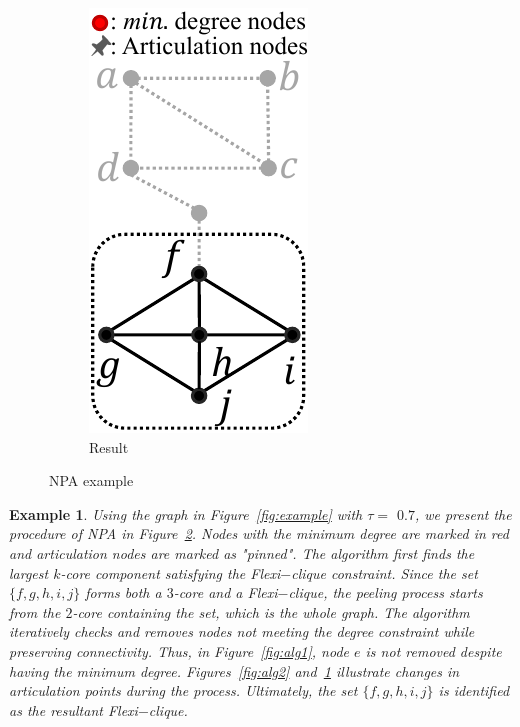 \documentclass[sigconf]{acmart}
\newtheorem{example}{Example}
\newcommand{\flexi}{\textsf{Flexi$-$clique}}
\newcommand{\NPA}{\textsf{NPA}}
\begin{document}
\begin{figure}[h]
\begin{subfigure}{.32\linewidth}
\includegraphics[width=0.7\linewidth]{figures/algorithm_3.pdf}
\vspace{-0.2cm}
\caption{Result}
\label{fig:alg3}
\end{subfigure}
\vspace{-0.3cm}
\caption{{\NPA} example}
\vspace{-0.3cm}
\label{fig:gpa}
\vspace{-0.3cm}
\end{figure}

\begin{example}
Using the graph in Figure~\ref{fig:example} with $\tau =$ $0.7$, we present the procedure of {\NPA} in Figure~\ref{fig:gpa}. Nodes with the minimum degree are marked in red and articulation nodes are marked as "pinned". The algorithm first finds the largest $k$-core component satisfying the {\flexi} constraint. Since the set $\{f, g, h, i, j\}$ forms both a $3$-core and a {\flexi}, the peeling process starts from the $2$-core containing the set, which is the whole graph. The algorithm iteratively checks and removes nodes not meeting the degree constraint while preserving connectivity. Thus, in Figure~\ref{fig:alg1}, node $e$ is not removed despite having the minimum degree. Figures~\ref{fig:alg2} and~\ref{fig:alg3} illustrate changes in articulation points during the process. Ultimately, the set $\{f, g, h, i, j\}$ is identified as the resultant {\flexi}.
\end{example}
\end{document}
